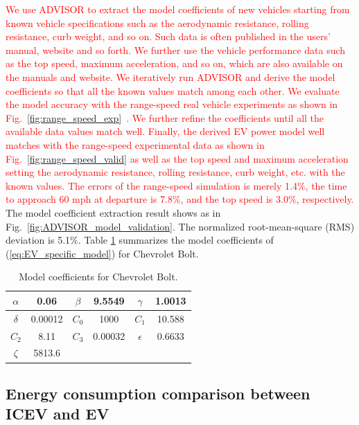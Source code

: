 \documentclass{IEEEtran}
\begin{document}
\textcolor{red}{We use ADVISOR to extract the model coefficients of new vehicles starting from known vehicle specifications such as the aerodynamic resistance, rolling resistance, curb weight, and so on. Such data is often published in the users' manual, website and so forth. We further use the vehicle performance data such as the top speed, maximum acceleration, and so on, which are also available on the manuals and website. We iteratively run ADVISOR and derive the model coefficients so that all the known values match among each other. We evaluate the model accuracy with the range-speed real vehicle experiments as shown in Fig.~\ref{fig:range_speed_exp}~\cite{GM_Bolt:range25mph,GM_Bolt:range65mph,GM_Bolt:range75mph,GM_Bolt:range93mph,GM_Bolt:range_speed}. We further refine the coefficients until all the available data values match well. Finally, the derived EV power model well matches with the range-speed experimental data as shown in Fig.~\ref{fig:range_speed_valid} as well as the top speed and maximum acceleration setting the aerodynamic resistance, rolling resistance, curb weight, etc. with the known values. The errors of the range-speed simulation is merely 1.4\%, the time to approach 60 mph at departure is 7.8\%, and the top speed is 3.0\%, respectively.} 
The model coefficient extraction result shows as in Fig.~\ref{fig:ADVISOR_model_validation}. The normalized root-mean-square (RMS) deviation is 5.1\%. Table \ref{table:Coeff_Bolt} summarizes the model coefficients of (\ref{eq:EV_specific_model}) for Chevrolet Bolt. 

\begin{table}
\caption{Model coefficients for Chevrolet Bolt.}
\label{table:Coeff_Bolt}
\centering
\begin{tabular}{|c|c|c|c|c|c|}  \hline
$\alpha$	&0.06		&$\beta$	&9.5549	&$\gamma$	&1.0013	\\ \hline
$\delta$	&0.00012 		&$C_0$	&1000 	&$C_1$		&10.588	\\ \hline
$C_2$	&8.11		&$C_3$	&0.00032	&$\epsilon$	&0.6633	\\ \hline
$\zeta$	&5813.6		\\ \cline{1-2}
\end{tabular}
\end{table}

\subsection{Energy consumption comparison between ICEV and EV} \label{subsec:comparison}
\end{document}
